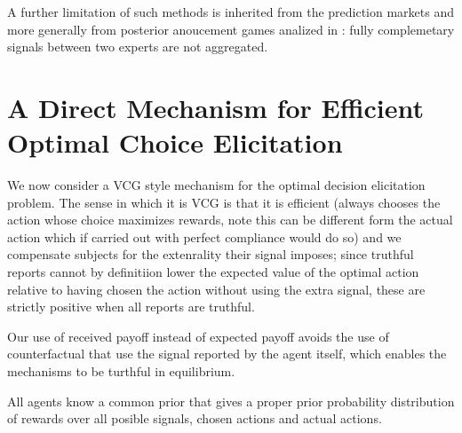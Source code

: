 A further limitation of such methods is inherited from the prediction markets and more generally from posterior anoucement games analized in \cite{ostrovsky2012information}: fully complemetary signals between two experts are not aggregated. 



\section{A Direct Mechanism for Efficient Optimal Choice Elicitation}


We now consider a VCG style mechanism for the optimal decision elicitation problem. 
The sense in which it is VCG is that it is efficient (always chooses the action whose choice maximizes rewards, note this can be different form the actual action which if carried out with perfect compliance would do so) and we compensate subjects for the extenrality their signal imposes; since truthful reports cannot by definitiion lower the expected value of the optimal action relative to having chosen the action without using the extra signal, these are strictly positive when all reports are truthful. 

Our use of received payoff instead of expected payoff avoids the use of counterfactual that use the signal reported by the agent itself, which enables the mechanisms to be turthful in equilibrium.

All agents know a common prior that gives a proper prior probability distribution of rewards over all posible signals, chosen actions and actual actions.

